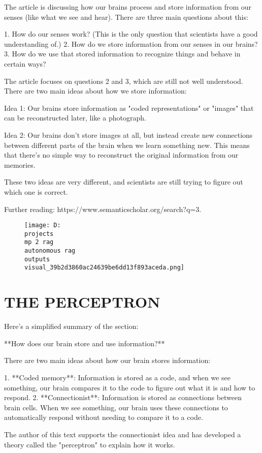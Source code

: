 \documentclass[12pt,a4paper]{article}
\begin{document}
The article is discussing how our brains process and store information from our senses (like what we see and hear). There are three main questions about this:

1. How do our senses work? (This is the only question that scientists have a good understanding of.)
2. How do we store information from our senses in our brains?
3. How do we use that stored information to recognize things and behave in certain ways?

The article focuses on questions 2 and 3, which are still not well understood. There are two main ideas about how we store information:

Idea 1: Our brains store information as "coded representations" or "images" that can be reconstructed later, like a photograph.

Idea 2: Our brains don't store images at all, but instead create new connections between different parts of the brain when we learn something new. This means that there's no simple way to reconstruct the original information from our memories.

These two ideas are very different, and scientists are still trying to figure out which one is correct.

Further reading: https://www.semanticscholar.org/search?q=3.%
\begin{figure}[h]
\centering
\texttt{[image: D:\\projects\\mp 2 rag\\autonomous rag\\outputs\\visual\_39b2d3860ac24639be6dd13f893aceda.png]}
\end{figure}
\section{THE PERCEPTRON}
Here's a simplified summary of the section:

**How does our brain store and use information?**

There are two main ideas about how our brain stores information:

1. **Coded memory**: Information is stored as a code, and when we see something, our brain compares it to the code to figure out what it is and how to respond.
2. **Connectionist**: Information is stored as connections between brain cells. When we see something, our brain uses these connections to automatically respond without needing to compare it to a code.

The author of this text supports the connectionist idea and has developed a theory called the "perceptron" to explain how it works.
\end{document}
